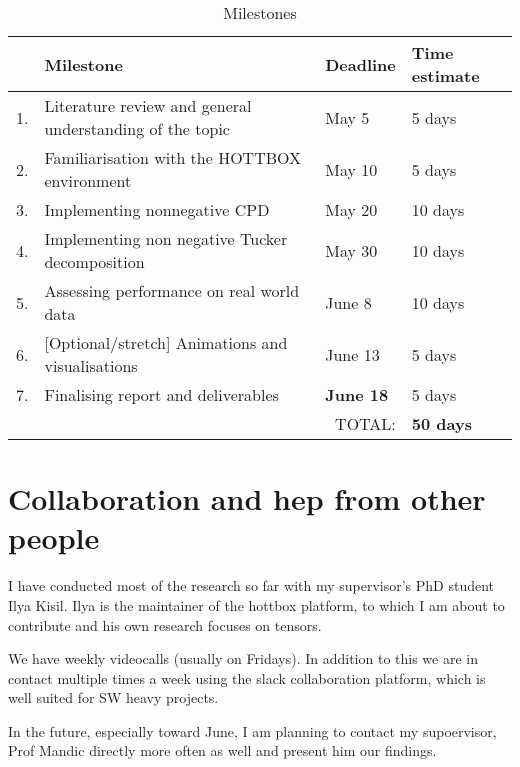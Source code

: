 \documentclass{article}
\begin{document}
\begin{table}[]
    \centering
    \begin{tabular}{r|X|l|l}
        & Milestone & Deadline & Time estimate \\ \hline
         1. & Literature review and general understanding of the topic & May 5 & 5 days \\
          2. & Familiarisation with the HOTTBOX environment & May 10 & 5 days \\
           3. & Implementing nonnegative CPD & May 20 & 10 days\\
            4. & Implementing non negative Tucker decomposition & May 30 & 10 days\\
             5. & Assessing performance on real world data & June 8 & 10 days \\
            6. & [Optional/stretch] Animations and visualisations & June 13 & 5 days \\
            7. & Finalising report and deliverables & \textbf{June 18} & 5 days \\
            \multicolumn{3}{r|}{TOTAL:} & \textbf{50 days} \\
    \end{tabular}
    \caption{Milestones}
    \label{tab:milestones}
\end{table}

\section{Collaboration and hep from other people \label{sec:collaboration}}

I have conducted most of the research so far with my supervisor's PhD student Ilya Kisil. Ilya is the maintainer of the hottbox platform, to which I am about to contribute and his own research focuses on tensors.

We have weekly videocalls (usually on Fridays). In addition to this we are in contact multiple times a  week using the slack collaboration platform, which is well suited for SW heavy projects.

In the future, especially toward June, I am planning to contact my supoervisor, Prof Mandic directly more often as well and present him our findings.

\cite{ctan}

\printbibliography
\end{document}
